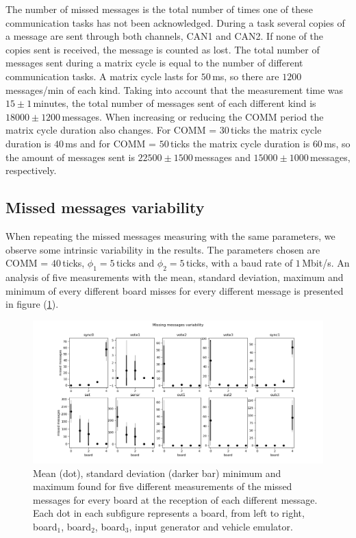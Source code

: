 \documentclass[table,xcdraw]{article}
\begin{document}
The number of missed messages is the total number of times one of these communication tasks has not been acknowledged. During a task several copies of a message are sent through both channels, CAN1 and CAN2. If none of the copies sent is received, the message is counted as lost. The total number of messages sent during a matrix cycle is equal to the number of different communication tasks. A matrix cycle lasts for $50\,$ms, so there are $1200\,$messages/min of each kind. Taking into account that the measurement time was $15\pm1\,$minutes, the total number of messages sent of each different kind is $18000\pm1200\,$messages. When increasing or reducing the COMM period the matrix cycle duration also changes. For COMM = $30\,$ticks the matrix cycle duration is $40\,$ms and for COMM = $50\,$ticks the matrix cycle duration is $60\,$ms, so the amount of messages sent is $22500\pm1500\,$messages and $15000\pm1000\,$messages, respectively.\\

\subsection{Missed messages variability}
When repeating the missed messages measuring with the same parameters, we observe some intrinsic variability in the results. The parameters chosen are COMM = $40\,$ticks, $\phi_1 = 5\,$ticks and $\phi_2 = 5\,$ticks, with a baud rate of $1\,$Mbit/s. An analysis of five measurements with the mean, standard deviation, maximum and minimum of every different board misses for every different message is presented in figure (\ref{fig:mss_msgs_var}).

\begin{figure}[h!]
    \centering
    \includegraphics[width=\textwidth]{figures/missing_msgs/missed_msgs_variability_analysis.png}
    \caption{Mean (dot), standard deviation (darker bar) minimum and maximum found for five different measurements of the missed messages for every board at the reception of each different message. Each dot in each subfigure represents a board, from left to right, board$_1$, board$_2$, board$_3$, input generator and vehicle emulator.}
    \label{fig:mss_msgs_var}
\end{figure}
\end{document}
